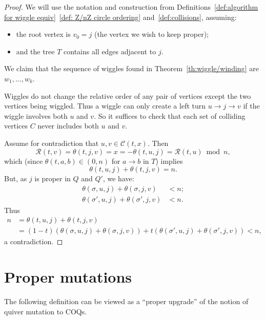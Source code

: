 \documentclass[11pt, letterpaper]{amsart}
\theoremstyle{definition}
\numberwithin{equation}{section}
\begin{document}
\begin{proof}
We will use the notation and construction from Definitions~\ref{def:algorithm for wiggle equiv}~\ref{def: Z/nZ circle ordering} and~\ref{def:collisions}, assuming:
\begin{itemize}
\item the root vertex is $v_0=j$ (the vertex we wish to keep proper); 
\item and the tree $T$ contains all edges adjacent to $j$.
\end{itemize} 
We claim that the sequence of wiggles found in Theorem~\ref{th:wiggle/winding} are $w_1, \ldots, w_k$. 

Wiggles do not change the relative order of any pair of vertices except the two vertices being wiggled. 
Thus a wiggle can only create a left turn $u \rightarrow j \rightarrow v$ if the wiggle involves both $u$ and $v$.
So it suffices to check that each set of colliding vertices $C$ never includes both $u$ and $v$. 

Assume for contradiction that $u,v \in \mathcal{C}(t,x)$.
Then
\begin{equation*}
\mathcal{R}(t, v) = \theta(t, j, v) = x =  -\theta(t, u, j) = \mathcal{R}(t, u) \bmod n,
\end{equation*}
which (since $\theta(t,a,b) \in (0, n)$ for $a \rightarrow b$ in $T$) implies $$\theta(t,u,j) + \theta(t,j,v) = n.$$ 
But, as $j$ is proper in $Q$ and $Q'$, we have: 
\begin{align*}
\theta(\sigma,u,j) + \theta(\sigma,j,v) &< n;\\
\theta(\sigma',u,j) + \theta(\sigma',j,v) &< n.
\end{align*}
Thus 
\begin{align*}
n &= \theta(t,u,j) + \theta(t,j,v) \\
&= (1-t) (\theta(\sigma,u,j) + \theta(\sigma,j,v)) + t (\theta(\sigma',u,j) + \theta(\sigma',j,v)) < n,
\end{align*}
 a contradiction.
\end{proof}


\newpage

\section{Proper mutations}
\label{sec:proper mutations}

The following definition can be viewed as a ``proper upgrade'' of the notion of quiver mutation to COQs. 
\end{document}
